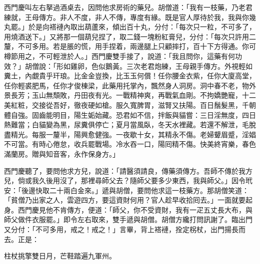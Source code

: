 西門慶叫左右拏過酒桌去，因問他求房術的藥兒。胡僧道：「我有一枝藥，乃老君練就，王母傳方。非人不度，非人不傳，專度有緣。既是官人厚待於我，我與你幾丸罷。」於是向褡褳內取出葫蘆來，傾出百十丸，分付：「每次只一粒，不可多了，用燒酒送下。」又將那一個葫兒捏了，取二錢一塊粉紅膏兒，分付：「每次只許用二釐，不可多用。若是脹的慌，用手捏着，兩邊腿上只顧摔打，百十下方得通。你可樽節用之，不可輕泄於人。」西門慶雙手接了，說道：「我且問你，這藥有何功效？」胡僧說：「形如雞卵，色似鵝黃。三次老君炮練，王母親手傳方。外視輕如糞土，內覷貴乎玕琅。比金金豈換，比玉玉何償！任你腰金衣紫，任你大廈高堂，任你輕裘肥馬，任你才俊棟梁，此藥用托掌內，飄然身人洞房。洞中春不老，物外景長芳；玉山無頹敗，丹田夜有光。一戰精神爽，再戰氣血剛。不拘嬌艷寵，十二美紅粧，交接從吾好，徹夜硬如槍。服久寬脾胃，滋腎又扶陽。百日鬚髮黑，千朝體自強。固齒能明目，陽生姤始藏。恐君如不信，拌飯與貓嘗：三日淫無度，四日熱難當；白貓變為黑，尿糞俱停亡；夏月當風臥，冬天水裡藏。若還不解泄，毛脫盡精光。每服一釐半，陽興愈健強。一夜歇十女，其精永不傷。老婦顰眉蹙，淫娼不可當。有時心倦怠，收兵罷戰場。冷水吞一口，陽囘精不傷。快美終宵樂，春色滿蘭房。贈與知音客，永作保身方。」

西門慶聽了，要問他求方兒，說道：「請醫須請良，傳藥須傳方。吾師不傳於我方兒，倘或我久後用沒了，那裡尋師父去？隨師父要多少東西，我與師父。」因令玳安：「後邊快取二十兩白金來。」遞與胡僧，要問他求這一枝藥方。那胡僧笑道：「貧僧乃出家之人，雲遊四方，要這資財何用？{}官人趁早收拾囘去。」一面就要起身。西門慶見他不肯傳方，便道：「師父，你不受資財，我有一疋五丈長大布，與師父做件衣服罷。」即令左右取來，雙手遞與胡僧。胡僧方纔打問訊謝了。臨出門又分付：「不可多用，戒之！戒之！」言畢，背上褡褳，拴定柺杖，出門揚長而去。正是：

\begin{myquote} 
柱杖挑擎雙日月，芒鞋踏遍九軍州。
\end{myquote} 

